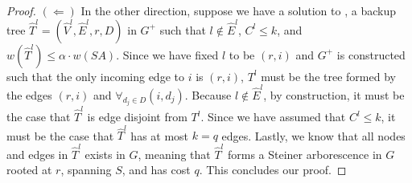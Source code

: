 \begin{proof}
$(\Leftarrow)$ In the other direction, suppose we have a solution to \mcos, a backup tree $\hat{T}^l=(\hat{V}^l,\hat{E}^l,r,D)$ in $G^+$ such that
$l \notin \hat{E}^l$, $C^l \leq k$, and $w(\hat{T}^l) \leq \alpha \cdot w(SA)$.
Since we have fixed $l$ to be $(r,i)$ and $G^+$ is constructed such 
that the only incoming edge to $i$ is $(r,i)$, $T^l$ must be the tree formed by the edges $(r,i)$ and $\forall_{d_j \in D} (i,d_j)$. %
Because $l \notin \hat{E}^l$, by construction, it must be the case that $\hat{T}^l$ is edge disjoint from $T^l$.  
Since we have assumed that $C^l \leq k$, it must be the case that $\hat{T}^l$ has at most $k=q$ edges.  Lastly, we know that all nodes and edges in $\hat{T}^l$ 
exists in $G$, meaning that $\hat{T}^l$ forms a Steiner arborescence in $G$ rooted at $r$, spanning $S$, and has cost $q$.  This concludes our proof.
\end{proof}


